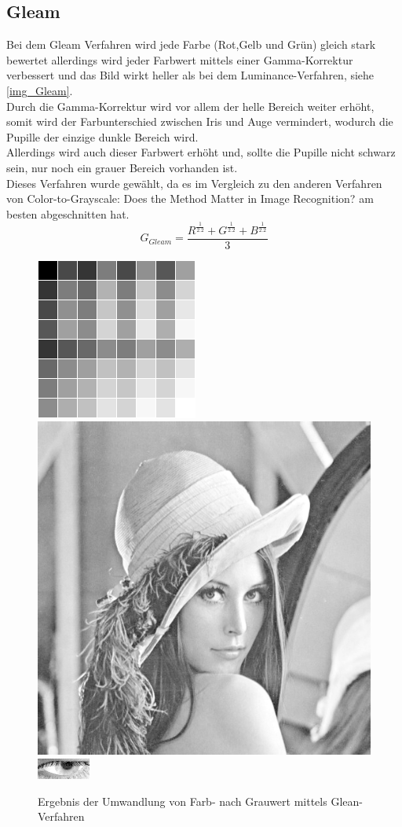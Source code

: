 \subsection{Gleam}
\label{gray_Gleam}
Bei dem Gleam Verfahren wird jede Farbe (Rot,Gelb und Grün) gleich stark bewertet allerdings wird jeder Farbwert mittels einer Gamma-Korrektur verbessert und das Bild wirkt heller als bei dem Luminance-Verfahren, siehe \autoref{img_Gleam}.\\
Durch die Gamma-Korrektur wird vor allem der helle Bereich weiter erhöht, somit wird der Farbunterschied zwischen Iris und Auge vermindert, wodurch die Pupille der einzige dunkle Bereich wird.\\
Allerdings wird auch dieser Farbwert erhöht und, sollte die Pupille nicht schwarz sein, nur noch ein grauer Bereich vorhanden ist.\\
Dieses Verfahren wurde gewählt, da es im Vergleich zu den anderen Verfahren von \glqq Color-to-Grayscale: Does the Method Matter in Image Recognition?\grqq \cite{rgb_to_Gray} am besten abgeschnitten hat.
\[G_{Gleam}=\dfrac{R^{\frac{1}{2.2}} + G^{\frac{1}{2.2}} + B^{\frac{1}{2.2}}}{3}\]
\begin{figure}
	\centering
	\includegraphics[width=0.2\linewidth]{img/Farbkarte_22}
	\includegraphics[width=0.2\linewidth]{img/Lena_22}
	\includegraphics[width=0.2\linewidth]{img/Auge_22Gray}
	\caption{Ergebnis der Umwandlung von Farb- nach Grauwert mittels Glean-Verfahren}
	\label{img_Gleam}
\end{figure}
